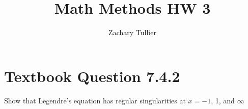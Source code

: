 \documentclass[12pt]{article}
\begin{document}
\singlespacing  %
\title{Math Methods HW 3}

\author[1]{Zachary Tullier}
\date{}
\maketitle

\section*{Textbook Question 7.4.2}
    Show that Legendre's equation has regular singularities at $x=-1$, 1, and $\infty$
\end{document}
